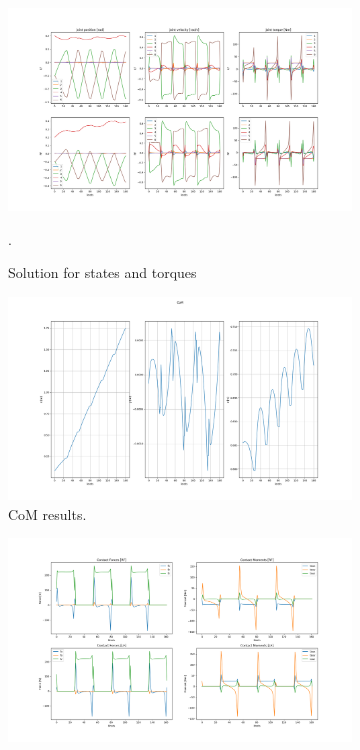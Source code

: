 \begin{figure}[h!]
\centering
\begin{subfigure}{.7\textwidth}
  \centering
  \includegraphics[width=1\linewidth]{Media/Crocoddyl/RH5Legs/FixedPeriodicity/RH5PeriodicGait_Solution.png}
  \caption{Solution for states and torques}.
\end{subfigure}
\begin{subfigure}{.7\textwidth}
  \centering
  \includegraphics[width=1\linewidth]{Media/Crocoddyl/RH5Legs/FixedPeriodicity/RH5PeriodicGait_CoM.png}
\caption{CoM results.}
\end{subfigure}
\begin{subfigure}{.7\textwidth}
  \centering
\includegraphics[width=1\linewidth]{Media/Crocoddyl/RH5Legs/FixedPeriodicity/RH5PeriodicGait_ContactWrenches.png}

\end{subfigure}
\end{figure}
